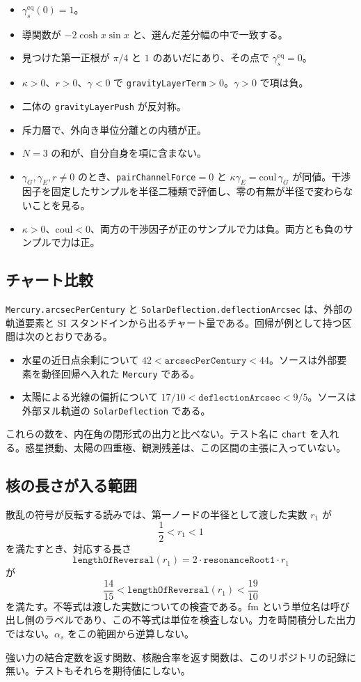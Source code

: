 \begin{itemize}
\item \(\gamma_s^{\mathrm{eq}}(0)=1\)。
\item 導関数が \(-2\cosh x\sin x\) と、選んだ差分幅の中で一致する。
\item 見つけた第一正根が \(\pi/4\) と \(1\) のあいだにあり、その点で \(\gamma_s^{\mathrm{eq}}=0\)。
\item \(\kappa>0\)、\(r>0\)、\(\gamma<0\) で \texttt{gravityLayerTerm}\(>0\)。\(\gamma>0\) で項は負。
\item 二体の \texttt{gravityLayerPush} が反対称。
\item 斥力層で、外向き単位分離との内積が正。
\item \(N=3\) の和が、自分自身を項に含まない。
\item \(\gamma_G,\gamma_E,r\neq 0\) のとき、\texttt{pairChannelForce}\(=0\) と \(\kappa\gamma_E=\mathrm{coul}\,\gamma_G\) が同値。干渉因子を固定したサンプルを半径二種類で評価し、零の有無が半径で変わらないことを見る。
\item \(\kappa>0\)、\(\mathrm{coul}<0\)、両方の干渉因子が正のサンプルで力は負。両方とも負のサンプルで力は正。
\end{itemize}

\subsection{チャート比較}

\texttt{Mercury.arcsecPerCentury} と \texttt{SolarDeflection.deflectionArcsec} は、外部の軌道要素と SI スタンドインから出るチャート量である。回帰が例として持つ区間は次のとおりである。

\begin{itemize}
\item 水星の近日点余剰について \(42<\texttt{arcsecPerCentury}<44\)。ソースは外部要素を動径回帰へ入れた \texttt{Mercury} である。
\item 太陽による光線の偏折について \(17/10<\texttt{deflectionArcsec}<9/5\)。ソースは外部ヌル軌道の \texttt{SolarDeflection} である。
\end{itemize}

これらの数を、内在角の閉形式の出力と比べない。テスト名に \texttt{chart} を入れる。惑星摂動、太陽の四重極、観測残差は、この区間の主張に入っていない。

\subsection{核の長さが入る範囲}

散乱の符号が反転する読みでは、第一ノードの半径として渡した実数 \(r_1\) が
\[
\frac12<r_1<1
\]
を満たすとき、対応する長さ
\[
\texttt{lengthOfReversal}(r_1)=2\cdot\texttt{resonanceRoot1}\cdot r_1
\]
が
\[
\frac{14}{15}<\texttt{lengthOfReversal}(r_1)<\frac{19}{10}
\]
を満たす。不等式は渡した実数についての検査である。fm という単位名は呼び出し側のラベルであり、この不等式は単位を検査しない。力を時間積分した出力ではない。\(\alpha_s\) をこの範囲から逆算しない。

強い力の結合定数を返す関数、核融合率を返す関数は、このリポジトリの記録に無い。テストもそれらを期待値にしない。
